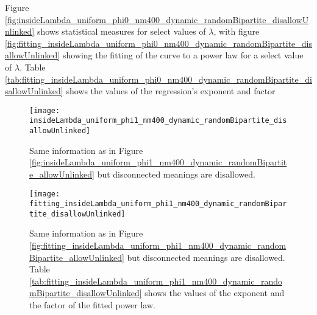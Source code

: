 Figure \ref{fig:insideLambda_uniform_phi0_nm400_dynamic_randomBipartite_disallowUnlinked} shows statistical measures for select values of $\lambda$, with figure \ref{fig:fitting_insideLambda_uniform_phi0_nm400_dynamic_randomBipartite_disallowUnlinked} showing the fitting of the curve to a power law for a select value of $\lambda$.
Table \ref{tab:fitting_insideLambda_uniform_phi0_nm400_dynamic_randomBipartite_disallowUnlinked} shows the values of the regression's exponent and factor

\begin{figure}
  \centering
  \texttt{[image: insideLambda\_uniform\_phi1\_nm400\_dynamic\_randomBipartite\_disallowUnlinked]}
  \caption{Same information as in Figure \ref{fig:insideLambda_uniform_phi1_nm400_dynamic_randomBipartite_allowUnlinked} but disconnected meanings are disallowed.}
  \label{fig:insideLambda_uniform_phi1_nm400_dynamic_randomBipartite_disallowUnlinked}
\end{figure}

\begin{figure}
  \centering
  \texttt{[image: fitting\_insideLambda\_uniform\_phi1\_nm400\_dynamic\_randomBipartite\_disallowUnlinked]}
  \caption{Same information as in Figure \ref{fig:fitting_insideLambda_uniform_phi1_nm400_dynamic_randomBipartite_allowUnlinked} but disconnected meanings are disallowed.
Table \ref{tab:fitting_insideLambda_uniform_phi1_nm400_dynamic_randomBipartite_disallowUnlinked} shows the values of the exponent and the factor of the fitted power law.}
  \label{fig:fitting_insideLambda_uniform_phi1_nm400_dynamic_randomBipartite_disallowUnlinked}
\end{figure}



